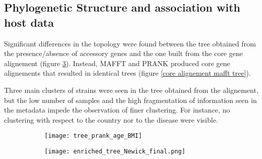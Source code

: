 \subsection*{Phylogenetic Structure and association with host data}
\graphicspath{{images/phylogeneticStructureHostData/}}




Significant differences in the topology were found between the tree obtained from the presence/absence of accessory genes
and the one built from the core gene alignement (figure \ref{fig:phylogenetic trees}). Instead,
MAFFT and PRANK produced core gene alignements that resulted in identical trees
(figure \ref{core alignement mafft tree}). 

Three main clusters of strains were seen in the tree obtained from the alignement, but the low number of samples and the high fragmentation of
information seen in the metadata impede the observation of finer clustering. 
For instance, no clustering with respect to the country nor to the disease were visible.


\begin{figure}[h!]
    \centering
    \begin{subfigure}[b]{0.7\textwidth}
        \centering
        \texttt{[image: tree\_prank\_age\_BMI]}
        \caption{}
        \label{fig:core alignment prank tree}
    \end{subfigure}
    \begin{subfigure}[b]{0.7\textwidth}
        \centering
        \texttt{[image: enriched\_tree\_Newick\_final.png]}
        \caption{}
        \label{fig:presence absence tree}
    \end{subfigure}
       \caption{}
       \label{fig:phylogenetic trees}
\end{figure}






